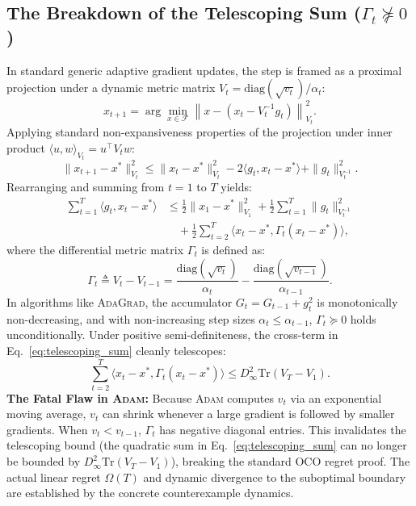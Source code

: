 \subsection{The Breakdown of the Telescoping Sum (\texorpdfstring{$\Gamma_t \not\succeq 0$}{Gamma\_t not PSD})}
In standard generic adaptive gradient updates, the step is framed as a proximal projection under a dynamic metric matrix $V_t = \text{diag}(\sqrt{v_t}) / \alpha_t$:
\begin{equation}
    x_{t+1} = \arg\min_{x \in \mathcal{F}} \left\| x - \left(x_t - V_t^{-1} g_t\right) \right\|_{V_t}^2.
\end{equation}
Applying standard non-expansiveness properties of the projection under inner product $\langle u, w \rangle_{V_t} = u^\top V_t w$:
\begin{equation}
    \| x_{t+1} - x^* \|_{V_t}^2 \le \| x_t - x^* \|_{V_t}^2 - 2 \langle g_t, x_t - x^* \rangle + \| g_t \|_{V_t^{-1}}^2.
\end{equation}
Rearranging and summing from $t=1$ to $T$ yields:
\begin{align}
    \sum_{t=1}^T \langle g_t, x_t - x^* \rangle &\le \frac{1}{2} \| x_1 - x^* \|_{V_1}^2 + \frac{1}{2} \sum_{t=1}^T \| g_t \|_{V_t^{-1}}^2 \nonumber \\
    &\quad + \frac{1}{2} \sum_{t=2}^T \langle x_t - x^*, \Gamma_t (x_t - x^*) \rangle,
    \label{eq:telescoping_sum}
\end{align}
where the differential metric matrix $\Gamma_t$ is defined as:
\begin{equation}
    \Gamma_t \triangleq V_t - V_{t-1} = \frac{\text{diag}(\sqrt{v_t})}{\alpha_t} - \frac{\text{diag}(\sqrt{v_{t-1}})}{\alpha_{t-1}}.
    \label{eq:gamma_def}
\end{equation}
In algorithms like \textsc{AdaGrad}, the accumulator $G_t = G_{t-1} + g_t^2$ is monotonically non-decreasing, and with non-increasing step sizes $\alpha_t \le \alpha_{t-1}$, $\Gamma_t \succeq 0$ holds unconditionally. Under positive semi-definiteness, the cross-term in Eq.~\eqref{eq:telescoping_sum} cleanly telescopes:
\begin{equation}
    \sum_{t=2}^T \langle x_t - x^*, \Gamma_t (x_t - x^*) \rangle \le D_\infty^2 \text{Tr}(V_T - V_1).
\end{equation}
\textbf{The Fatal Flaw in \textsc{Adam}:} Because \textsc{Adam} computes $v_t$ via an exponential moving average, $v_t$ can shrink whenever a large gradient is followed by smaller gradients. When $v_t < v_{t-1}$, $\Gamma_t$ has negative diagonal entries. This invalidates the telescoping bound (the quadratic sum in Eq.~\eqref{eq:telescoping_sum} can no longer be bounded by $D_\infty^2 \text{Tr}(V_T - V_1)$), breaking the standard OCO regret proof. The actual linear regret $\Omega(T)$ and dynamic divergence to the suboptimal boundary are established by the concrete counterexample dynamics.

